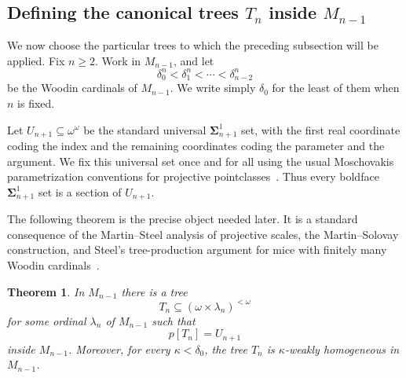 \documentclass[a4paper,11pt]{article}
\newtheorem{theorem}{Theorem}[section]
\begin{document}
\subsection{Defining the canonical trees $T_n$ inside $M_{n-1}$}\label{subsec:canonical-trees-tn}

We now choose the particular trees to which the preceding subsection will be applied.  Fix $n\geq 2$.  Work in $M_{n-1}$, and let
\[
   \delta^n_0<\delta^n_1<\cdots<\delta^n_{n-2}
\]
be the Woodin cardinals of $M_{n-1}$.  We write simply $\delta_0$ for the least of them when $n$ is fixed.

Let $U_{n+1}\subseteq\omega^\omega$ be the standard universal $\boldsymbol{\Sigma}^1_{n+1}$ set, with the first real coordinate coding the index and the remaining coordinates coding the parameter and the argument.  We fix this universal set once and for all using the usual Moschovakis parametrization conventions for projective pointclasses~\cite{Moschovakis}.  Thus every boldface $\boldsymbol{\Sigma}^1_{n+1}$ set is a section of $U_{n+1}$.

The following theorem is the precise object needed later.  It is a standard consequence of the Martin--Steel analysis of projective scales, the Martin--Solovay construction, and Steel's tree-production argument for mice with finitely many Woodin cardinals~\cite{martin2008tree,Steel2,steel2009derived}.

\begin{theorem}\label{thm:canonical-tn-existence}
In $M_{n-1}$ there is a tree
\[
   T_n\subseteq (\omega\times\lambda_n)^{<\omega}
\]
for some ordinal $\lambda_n$ of $M_{n-1}$ such that
\[
   p[T_n]=U_{n+1}
\]
inside $M_{n-1}$.  Moreover, for every $\kappa<\delta_0$, the tree $T_n$ is $\kappa$-weakly homogeneous in $M_{n-1}$.
\end{theorem}
\end{document}
